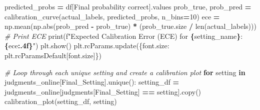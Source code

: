 \documentclass[
]{article}
\newenvironment{Shaded}{\begin{snugshade}}{\end{snugshade}}
\newcommand{\BuiltInTok}[1]{#1}
\newcommand{\CommentTok}[1]{\textcolor[rgb]{0.56,0.35,0.01}{\textit{#1}}}
\newcommand{\ControlFlowTok}[1]{\textcolor[rgb]{0.13,0.29,0.53}{\textbf{#1}}}
\newcommand{\DecValTok}[1]{\textcolor[rgb]{0.00,0.00,0.81}{#1}}
\newcommand{\KeywordTok}[1]{\textcolor[rgb]{0.13,0.29,0.53}{\textbf{#1}}}
\newcommand{\NormalTok}[1]{#1}
\newcommand{\OperatorTok}[1]{\textcolor[rgb]{0.81,0.36,0.00}{\textbf{#1}}}
\newcommand{\SpecialCharTok}[1]{\textcolor[rgb]{0.81,0.36,0.00}{\textbf{#1}}}
\newcommand{\SpecialStringTok}[1]{\textcolor[rgb]{0.31,0.60,0.02}{#1}}
\newcommand{\StringTok}[1]{\textcolor[rgb]{0.31,0.60,0.02}{#1}}
\begin{document}
\begin{Shaded}
\begin{Highlighting}[]
\NormalTok{    predicted\_probs }\OperatorTok{=}\NormalTok{ df[}\StringTok{\textquotesingle{}Final probability correct\textquotesingle{}}\NormalTok{].values}
\NormalTok{    prob\_true, prob\_pred }\OperatorTok{=}\NormalTok{ calibration\_curve(actual\_labels, predicted\_probs, n\_bins}\OperatorTok{=}\DecValTok{10}\NormalTok{)}
\NormalTok{    ece }\OperatorTok{=}\NormalTok{ np.mean(np.}\BuiltInTok{abs}\NormalTok{(prob\_pred }\OperatorTok{{-}}\NormalTok{ prob\_true) }\OperatorTok{*}\NormalTok{ (prob\_true.size }\OperatorTok{/} \BuiltInTok{len}\NormalTok{(actual\_labels)))}
    \CommentTok{\# Print ECE}
    \BuiltInTok{print}\NormalTok{(}\SpecialStringTok{f"Expected Calibration Error (ECE) for }\SpecialCharTok{\{}\NormalTok{setting\_name}\SpecialCharTok{\}}\SpecialStringTok{: }\SpecialCharTok{\{}\NormalTok{ece}\SpecialCharTok{:.4f\}}\SpecialStringTok{"}\NormalTok{)}
\NormalTok{    plt.show()}
\NormalTok{    plt.rcParams.update(\{}\StringTok{\textquotesingle{}font.size\textquotesingle{}}\NormalTok{: plt.rcParamsDefault[}\StringTok{\textquotesingle{}font.size\textquotesingle{}}\NormalTok{]\})}

\CommentTok{\# Loop through each unique setting and create a calibration plot}
\ControlFlowTok{for}\NormalTok{ setting }\KeywordTok{in}\NormalTok{ judgments\_online[}\StringTok{\textquotesingle{}Final\_Setting\textquotesingle{}}\NormalTok{].unique():}
\NormalTok{    setting\_df }\OperatorTok{=}\NormalTok{ judgments\_online[judgments[}\StringTok{\textquotesingle{}Final\_Setting\textquotesingle{}}\NormalTok{] }\OperatorTok{==}\NormalTok{ setting].copy()}
\NormalTok{    calibration\_plot(setting\_df, setting)}
\end{Highlighting}
\end{Shaded}
\end{document}
